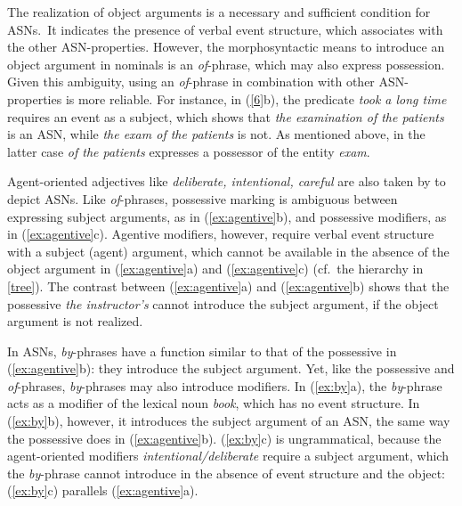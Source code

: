 \documentclass[output=paper]{langsci/langscibook}
\begin{document}
 The realization of object arguments is a necessary and sufficient condition for ASNs.\ It indicates the presence of verbal event structure, which associates with the other ASN-properties. However, the morphosyntactic means to introduce an object argument in nominals is an \textit{of}-phrase, which may also express possession. Given this ambiguity, using an  \textit{of}-phrase in combination with other ASN-properties is more reliable. For instance, in  (\ref{6}b), the predicate \textit{took a long time} requires an event as a subject, which shows that \textit{the examination of the patients} is an ASN, while \textit{the exam of the patients} is not.
As mentioned above, in the latter case \textit{of the patients} expresses a possessor of the entity \textit{exam}.

Agent-oriented adjectives like \textit{deliberate, intentional, careful} are also taken by \citet[51--52]{grimshaw:90} to depict ASNs.  Like \textit{of}-phrases, possessive marking is ambiguous between expressing subject arguments, as in (\ref{ex:agentive}b), and possessive modifiers,  as in (\ref{ex:agentive}c). Agentive modifiers, however, require verbal event structure with a subject (agent) argument, which cannot be available in the absence of the object argument in (\ref{ex:agentive}a) and (\ref{ex:agentive}c) (cf.~the hierarchy in \ref{tree}). The contrast between (\ref{ex:agentive}a) and (\ref{ex:agentive}b) shows that the possessive \textit{the instructor's} cannot introduce the subject argument, if the object argument is not realized.

\begin{exe}
\end{exe}

 In ASNs, \textit{by}-phrases have a function similar to that of the possessive in (\ref{ex:agentive}b): they introduce the subject argument. Yet, like the possessive and \textit{of}-phrases, \textit{by}-phrases may also introduce modifiers. In (\ref{ex:by}a), the \textit{by}-phrase acts as a modifier of the lexical noun \textit{book}, which has no event structure. In (\ref{ex:by}b), however, it introduces the subject argument of an ASN, the same way the possessive does in (\ref{ex:agentive}b). (\ref{ex:by}c) is ungrammatical, because the agent-oriented modifiers \textit{intentional/deliberate} require a subject argument, which the \textit{by}-phrase cannot introduce in the absence of event structure and the object: (\ref{ex:by}c) parallels (\ref{ex:agentive}a).
\end{document}
